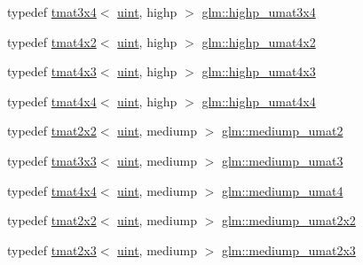 \begin{DoxyCompactItemize}
\item 
typedef \hyperlink{structglm_1_1tmat3x4}{tmat3x4}$<$ \hyperlink{group__core__precision_ga4fd29415871152bfb5abd588334147c8}{uint}, highp $>$ \hyperlink{group__gtc__matrix__integer_gaa2fb29026c9c80c7d17b5389e36d6aa7}{glm\+::highp\+\_\+umat3x4}
\item 
typedef \hyperlink{structglm_1_1tmat4x2}{tmat4x2}$<$ \hyperlink{group__core__precision_ga4fd29415871152bfb5abd588334147c8}{uint}, highp $>$ \hyperlink{group__gtc__matrix__integer_ga4015bf99a981bf271fd516f9b2cb6724}{glm\+::highp\+\_\+umat4x2}
\item 
typedef \hyperlink{structglm_1_1tmat4x3}{tmat4x3}$<$ \hyperlink{group__core__precision_ga4fd29415871152bfb5abd588334147c8}{uint}, highp $>$ \hyperlink{group__gtc__matrix__integer_gaa394320db559302e18c8b64013b8d7fb}{glm\+::highp\+\_\+umat4x3}
\item 
typedef \hyperlink{structglm_1_1tmat4x4}{tmat4x4}$<$ \hyperlink{group__core__precision_ga4fd29415871152bfb5abd588334147c8}{uint}, highp $>$ \hyperlink{group__gtc__matrix__integer_gaf5365128f6fd506442843fb5a441f385}{glm\+::highp\+\_\+umat4x4}
\item 
typedef \hyperlink{structglm_1_1tmat2x2}{tmat2x2}$<$ \hyperlink{group__core__precision_ga4fd29415871152bfb5abd588334147c8}{uint}, mediump $>$ \hyperlink{group__gtc__matrix__integer_ga85bc35173415dba31bb964c2940feeec}{glm\+::mediump\+\_\+umat2}
\item 
typedef \hyperlink{structglm_1_1tmat3x3}{tmat3x3}$<$ \hyperlink{group__core__precision_ga4fd29415871152bfb5abd588334147c8}{uint}, mediump $>$ \hyperlink{group__gtc__matrix__integer_ga953d4cb3e70d85567756b3fbcca0e9e9}{glm\+::mediump\+\_\+umat3}
\item 
typedef \hyperlink{structglm_1_1tmat4x4}{tmat4x4}$<$ \hyperlink{group__core__precision_ga4fd29415871152bfb5abd588334147c8}{uint}, mediump $>$ \hyperlink{group__gtc__matrix__integer_ga3eb3a5d85ec876ba65fad5525a5dda56}{glm\+::mediump\+\_\+umat4}
\item 
typedef \hyperlink{structglm_1_1tmat2x2}{tmat2x2}$<$ \hyperlink{group__core__precision_ga4fd29415871152bfb5abd588334147c8}{uint}, mediump $>$ \hyperlink{group__gtc__matrix__integer_gafce8777b8b0d9d7f810853b22de3be1b}{glm\+::mediump\+\_\+umat2x2}
\item 
typedef \hyperlink{structglm_1_1tmat2x3}{tmat2x3}$<$ \hyperlink{group__core__precision_ga4fd29415871152bfb5abd588334147c8}{uint}, mediump $>$ \hyperlink{group__gtc__matrix__integer_ga23dfc19249ad27dc4b02615f1d045ba1}{glm\+::mediump\+\_\+umat2x3}

\end{DoxyCompactItemize}
